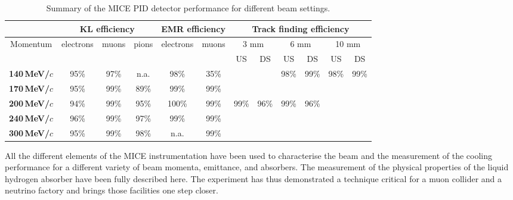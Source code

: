 \begin{table}[htb!]
	\caption{Summary of the MICE PID detector performance for different beam settings.}
  \begin{center}
  \begin{tabular}{|c|ccc|cc|cc|cc|cc|}
    \hline
  &

  \multicolumn{3}{c|}{\textbf{KL efficiency}} &
  \multicolumn{2}{c|}{\textbf{EMR efficiency}} &
  \multicolumn{6}{c|}{\textbf{Track finding efficiency}} \\ 
  \hline
  \multirow{2}{*}{Momentum} &
  \multirow{2}{*}{electrons} &
  \multirow{2}{*}{muons} &
  \multirow{2}{*}{pions} &
  \multirow{2}{*}{electrons} &
  \multirow{2}{*}{muons} &
  \multicolumn{2}{c|}{3 mm} &
  \multicolumn{2}{c|}{6 mm} &
  \multicolumn{2}{c|}{10 mm} \\  
             &      &      &      &       &      & US   & DS   & US   & DS   & US   & DS   \\ \hline
\textbf{140\,MeV/$c$} & 95\% & 97\% & n.a.   & 98\%  & 35\% &        &      & 98\%   & 99\% & 98\% & 99\% \\ \hline
\textbf{170\,MeV/$c$} & 95\% & 99\% & 89\% & 99\%  & 99\% &        &      &          &        &        &      \\ \hline
\textbf{200\,MeV/$c$} & 94\% & 99\% & 95\% & 100\% & 99\% & 99\% & 96\% & 99\% & 96\% &        &      \\ \hline
\textbf{240\,MeV/$c$} & 96\% & 99\% & 97\% & 99\%  & 99\% &        &      &          &        &        &      \\ \hline
\textbf{300\,MeV/$c$} & 95\% & 99\% & 98\% & n.a.    & 99\% &        &      &          &        &        &      \\ \hline
  \end{tabular}
	\label{tab:pid2}
  \end{center}
\end{table}
All the different elements of the MICE instrumentation have been used to characterise the beam and the measurement of the cooling performance for a different variety of beam momenta, emittance, and absorbers. The measurement of the physical properties of the liquid hydrogen absorber have been fully described here.
The experiment has thus demonstrated a technique critical for a muon collider and a neutrino factory and brings those facilities one step closer.
